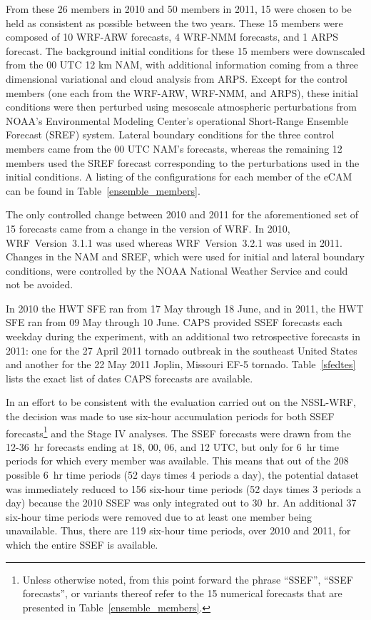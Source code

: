 From these 26 members in 2010 and 50 members in 2011, 15 were chosen to be held as consistent as possible between the two years.
These 15 members were composed of 10 WRF-ARW forecasts, 4 WRF-NMM forecasts, and 1 ARPS forecast.
The background initial conditions for these 15 members were downscaled from the 00 UTC 12 km NAM, with additional information coming from a three dimensional variational and cloud analysis from ARPS.
Except for the control members (one each from the WRF-ARW, WRF-NMM, and ARPS), these initial conditions were then perturbed using mesoscale atmospheric perturbations from NOAA's Environmental Modeling Center's operational Short-Range Ensemble Forecast (SREF) system.
Lateral boundary conditions for the three control members came from the 00 UTC NAM's forecasts, whereas the remaining 12 members used the SREF forecast corresponding to the perturbations used in the initial conditions.
A listing of the configurations for each member of the eCAM can be found in \mbox{Table \ref{ensemble_members}}.


The only controlled change between 2010 and 2011 for the aforementioned set of 15 forecasts came from a change in the version of WRF. In 2010, \mbox{WRF Version 3.1.1} was used whereas \mbox{WRF Version 3.2.1} was used in 2011.
Changes in the NAM and SREF, which were used for initial and lateral boundary conditions, were controlled by the NOAA National Weather Service and could not be avoided.


In 2010 the HWT SFE ran from 17 May through 18 June, and in 2011, the HWT SFE ran from 09  May through 10 June.
CAPS provided SSEF forecasts each weekday during the experiment, with an additional two retrospective forecasts in 2011: one for the 27 April 2011 tornado outbreak in the southeast United States and another for the 22 May 2011 Joplin, Missouri EF-5 tornado.
\mbox{Table \ref{sfedtes}} lists the exact list of dates CAPS forecasts are available.


In an effort to be consistent with the evaluation carried out on the NSSL-WRF, the decision was made to use six-hour accumulation periods for both SSEF forecasts\footnote{Unless otherwise noted, from this point forward the phrase ``SSEF'', ``SSEF forecasts'', or variants thereof refer to the 15 numerical forecasts that are presented in \mbox{Table \ref{ensemble_members}}.} and the Stage IV analyses.
The SSEF forecasts were drawn from the \mbox{12-36 hr} forecasts ending at 18, 00, 06, and 12 UTC, but only for \mbox{6 hr} time periods for which every member was available.
This means that out of the 208 possible \mbox{6 hr} time periods (52 days times 4 periods a day), the potential dataset was immediately reduced to 156 six-hour time periods (52 days times 3 periods a day) because the 2010 SSEF was only integrated out to \mbox{30 hr}.
An additional 37 six-hour time periods were removed due to at least one member being unavailable.
Thus, there are 119 six-hour time periods, over 2010 and 2011, for which the entire SSEF is available.





